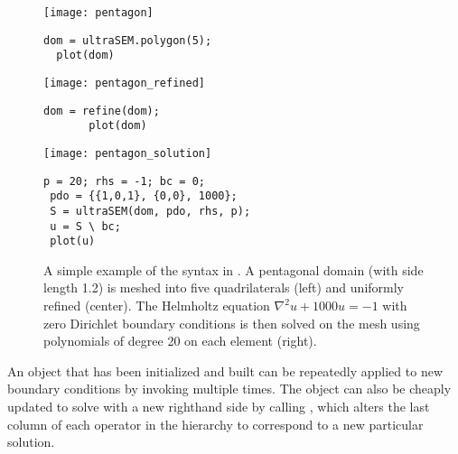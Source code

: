 \begin{figure}[htb]
	\centering
    \begin{minipage}{0.33\textwidth}
    \centering
    \texttt{[image: pentagon]} \\
    \begin{lstlisting}[style=Matlab-editor, basicstyle=\footnotesize\mlttfamily]
  dom = ultraSEM.polygon(5);
  plot(dom)
    \end{lstlisting}
    \vspace{1.27cm}
    \end{minipage}%
    \hspace{-0.4cm}%
    \begin{minipage}{0.33\textwidth}
    \centering
    \texttt{[image: pentagon\_refined]} \\
    \begin{lstlisting}[style=Matlab-editor, basicstyle=\footnotesize\mlttfamily]
       dom = refine(dom);
       plot(dom)
    \end{lstlisting}
    \vspace{1.27cm}
    \end{minipage}%
    \hspace{-0.1cm}%
    \begin{minipage}{0.33\textwidth}
    \centering
    \texttt{[image: pentagon\_solution]}
    \begin{lstlisting}[style=Matlab-editor, basicstyle=\footnotesize\mlttfamily, linewidth=5.8cm]
 p = 20; rhs = -1; bc = 0;
 pdo = {{1,0,1}, {0,0}, 1000};
 S = ultraSEM(dom, pdo, rhs, p);
 u = S \ bc;
 plot(u)
    \end{lstlisting}
    \end{minipage}
    \vspace{-0.8em}
	\caption{A simple example of the syntax in \ultraSEM. A pentagonal domain (with side length 1.2) is meshed into five quadrilaterals (left) and uniformly refined (center). The Helmholtz equation $\nabla^2 u + 1000 u = -1$ with zero Dirichlet boundary conditions is then solved on the mesh using polynomials of degree 20 on each element (right).}
	\label{fig:\chap:code_ex}
\end{figure}

An  object that has been initialized and built can be repeatedly applied to new boundary conditions by invoking  multiple times. The object can also be cheaply updated to solve with a new righthand side by calling , which alters the last column of each operator in the hierarchy to correspond to a new particular solution.

